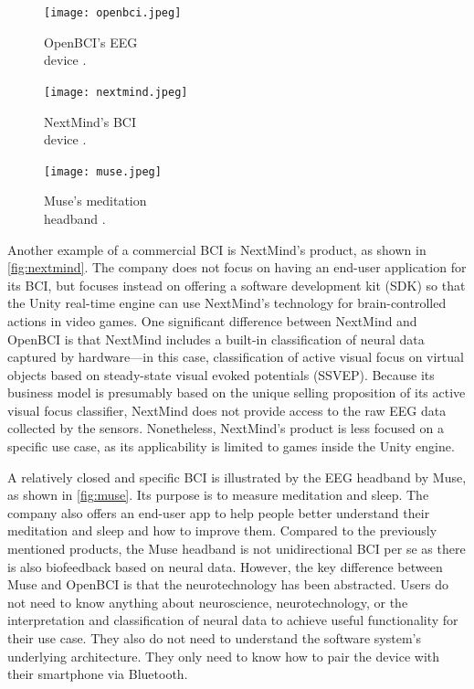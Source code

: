 \begin{figure}[!ht]
  \texttt{[image: openbci.jpeg]}
  \caption[OpenBCI's EEG device]{OpenBCI's EEG \\ device \citep{be_superhvman_conor_2017}.}
  \label{fig:openbci}
  \endminipage\hfill
  \texttt{[image: nextmind.jpeg]}
  \caption[NextMind's BCI device]{NextMind's BCI \\ device \citep{louise_neurotechnology_2019}.}
  \label{fig:nextmind}
  \endminipage\hfill
  \texttt{[image: muse.jpeg]}
  \caption[Muse's meditation headband]{Muse's meditation \\ headband \citep{muse_muse_nodate}.}
  \label{fig:muse}
  \endminipage
\end{figure}

Another example of a commercial BCI is NextMind’s product, as shown in \autoref{fig:nextmind}. The company does not focus on having an end-user application for its BCI, but focuses instead on offering a software development kit (SDK) so that the Unity real-time engine can use NextMind’s technology for brain-controlled actions in video games. One significant difference between NextMind and OpenBCI is that NextMind includes a built-in classification of neural data captured by hardware—in this case, classification of active visual focus on virtual objects based on steady-state visual evoked potentials (SSVEP). Because its business model is presumably based on the unique selling proposition of its active visual focus classifier, NextMind does not provide access to the raw EEG data collected by the sensors. Nonetheless, NextMind’s product is less focused on a specific use case, as its applicability is limited to games inside the Unity engine.

A relatively closed and specific BCI is illustrated by the EEG headband by Muse, as shown in \autoref{fig:muse}. Its purpose is to measure meditation and sleep. The company also offers an end-user app to help people better understand their meditation and sleep and how to improve them. Compared to the previously mentioned products, the Muse headband is not unidirectional BCI per se as there is also biofeedback based on neural data. However, the key difference between Muse and OpenBCI is that the neurotechnology has been abstracted. Users do not need to know anything about neuroscience, neurotechnology, or the interpretation and classification of neural data to achieve useful functionality for their use case. They also do not need to understand the software system’s underlying architecture. They only need to know how to pair the device with their smartphone via Bluetooth.

